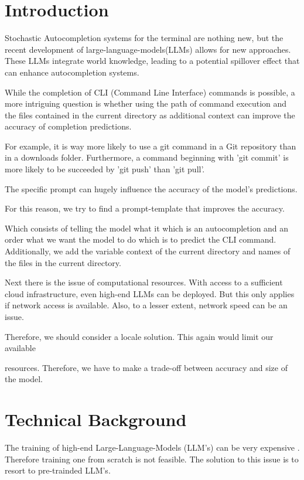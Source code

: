 \section{Introduction}

Stochastic Autocompletion systems for the terminal are nothing new, but the recent development of large-language-models(LLMs) allows for new approaches. These LLMs integrate world knowledge, leading to a potential spillover effect that can enhance autocompletion systems.



While the completion of CLI (Command Line Interface) commands is possible, a more intriguing question is whether using the path of command execution and the files contained in the current directory as additional context can improve the accuracy of completion predictions.


For  example, it is way more likely to use a git command in a Git repository than in a downloads folder. Furthermore, a command beginning with 'git commit' is more likely to be succeeded by 'git push' than 'git pull'.



The specific prompt can hugely influence the accuracy of the model's predictions.

For this reason, we try to find a prompt-template that improves the accuracy.

Which consists of telling the model what it which is an autocompletion and an order what we want the model to do which is to predict the CLI command. Additionally, we add the variable context of the current directory and names of the files in the current directory. 



Next there is the issue of computational resources. With access to a sufficient cloud infrastructure, even high-end LLMs can be deployed. But this only applies if network access is available. Also, to a lesser extent, network speed can be an issue. 

Therefore, we should consider a locale solution. This  again would limit our available 

resources. Therefore, we have to make a trade-off between accuracy and size of the model.


\section{Technical Background}

The training of high-end Large-Language-Models (LLM's) can be very expensive \cite{sharir2020cost}. Therefore training one from scratch is not feasible.
The solution to this issue is to resort to pre-trainded LLM's. 


